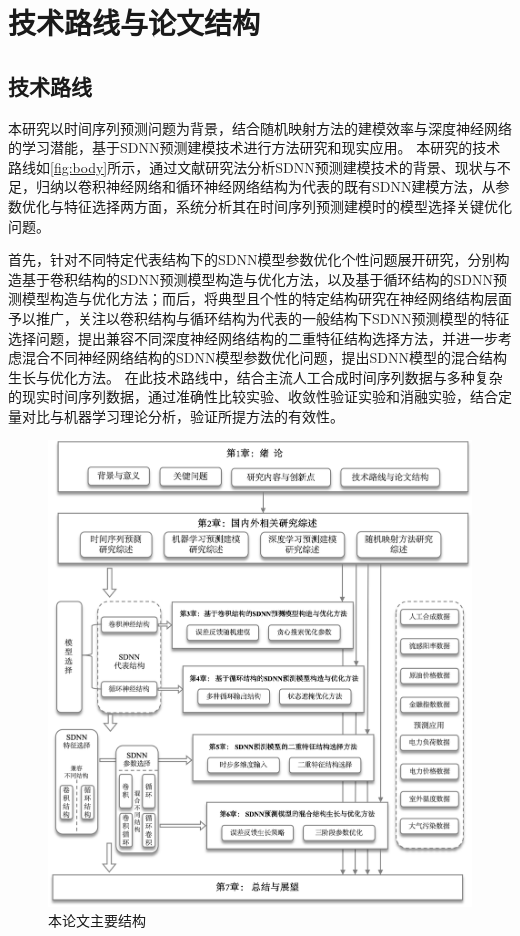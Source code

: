 \section{技术路线与论文结构}
\subsection{技术路线\label{sec:thesisRoad}}
本研究以时间序列预测问题为背景，结合随机映射方法的建模效率与深度神经网络的学习潜能，基于SDNN预测建模技术进行方法研究和现实应用。
本研究的技术路线如\autoref{fig:body}所示，通过文献研究法分析SDNN预测建模技术的背景、现状与不足，归纳以卷积神经网络和循环神经网络结构为代表的既有SDNN建模方法，从参数优化与特征选择两方面，系统分析其在时间序列预测建模时的模型选择关键优化问题。

首先，针对不同特定代表结构下的SDNN模型参数优化个性问题展开研究，分别构造基于卷积结构的SDNN预测模型构造与优化方法，以及基于循环结构的SDNN预测模型构造与优化方法；而后，将典型且个性的特定结构研究在神经网络结构层面予以推广，关注以卷积结构与循环结构为代表的一般结构下SDNN预测模型的特征选择问题，提出兼容不同深度神经网络结构的二重特征结构选择方法，并进一步考虑混合不同神经网络结构的SDNN模型参数优化问题，提出SDNN模型的混合结构生长与优化方法。
在此技术路线中，结合主流人工合成时间序列数据与多种复杂的现实时间序列数据，通过准确性比较实验、收敛性验证实验和消融实验，结合定量对比与机器学习理论分析，验证所提方法的有效性。

\begin{figure}[!t]
    \centering
    \includegraphics[width=0.95\linewidth]{float/ch.intro/thesis_content.png}
    \caption{\label{fig:body.arch}本论文主要结构}
\end{figure}

